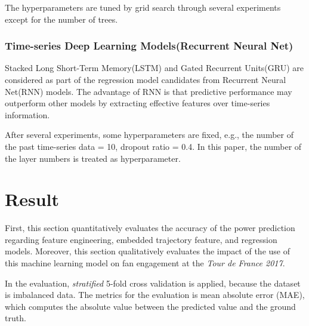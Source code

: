 \documentclass[runningheads]{llncs}
\begin{document}
The hyperparameters are tuned by grid search through several experiments except for the number of trees.

\subsubsection{Time-series Deep Learning Models(Recurrent Neural Net)}
Stacked Long Short-Term Memory(LSTM)\cite{ref_14} and Gated Recurrent Units(GRU)\cite{ref_15} are considered as part of the regression model candidates from Recurrent Neural Net(RNN) models. The advantage of RNN is that predictive performance may outperform other models by extracting effective features over time-series information.

After several experiments, some hyperparameters are fixed, e.g., the number of the past time-series data = 10, dropout ratio = 0.4. In this paper, the number of the layer numbers is treated as hyperparameter.

\section{Result}
First, this section quantitatively evaluates the accuracy of the power prediction regarding feature engineering, embedded trajectory feature, and regression models. Moreover, this section qualitatively evaluates the impact of the use of this machine learning model on fan engagement at the {\it{Tour de France 2017}}.

In the evaluation, {\it{stratified}} 5-fold cross validation is applied, because the dataset is imbalanced data. The metrics for the evaluation is mean absolute error (MAE), which computes the absolute value between the predicted value and the ground truth.
\end{document}
